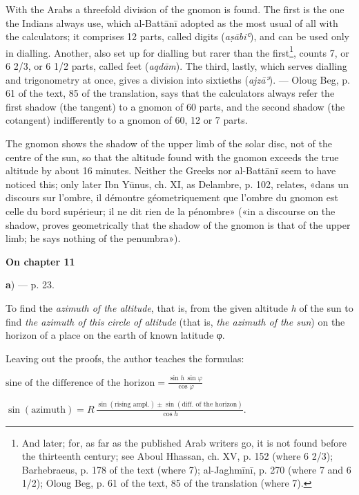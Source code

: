 \documentclass[11pt]{article}
\newcommand{\Pg}[1]{\marginpar{\footnotesize\color{gray}#1}}
\newcommand{\UnitHead}[2]{\par\setcounter{footnoteT}{0}\needspace{8\baselineskip}\bigskip\pdfbookmark[1]{#1}{unit-#2}\hypertarget{EN-#2}{}%
 {\large\bfseries\interlinepenalty=10000 #1\par}\nobreak\medskip}
\begin{document}
\par With the Arabs a threefold division of the gnomon is found. The first is the one the Indians always use, which al-Battānī adopted as the most usual of all with the calculators; it comprises 12 parts, called digits (\emph{aṣābiʿ}), and can be used only in dialling. Another, also set up for dialling but rarer than the first\footnote{And later; for, as far as the published Arab writers go, it is not found before the thirteenth century; see Aboul Hhassan, ch. XV, p. 152 (where 6 2/3); Barhebraeus, p. 178 of the text (where 7); al-Jaghmīnī, p. 270 (where 7 and 6 1/2); Oloug Beg, p. 61 of the text, 85 of the translation (where 7).}, counts 7, or 6 2/3, or 6 1/2 parts, called feet (\emph{aqdām}). The third, lastly, which serves dialling and trigonometry at once, gives a division into sixtieths (\emph{ajzāʾ}). — Oloug Beg, p. 61 of the text, 85 of the translation, says that the calculators always refer the first shadow (the tangent) to a gnomon of 60 parts, and the second shadow (the cotangent) indifferently to a gnomon of 60, 12 or 7 parts.\par
\par The gnomon shows the shadow of the upper limb of the solar disc, not of the centre of the sun, so that the altitude found with the gnomon exceeds the true altitude by about 16 minutes. Neither the Greeks nor al-Battānī seem to have noticed this; only later Ibn Yūnus, ch. XI, as Delambre, p. 102, relates, «dans un discours sur l’ombre, il démontre géometriquement que l’ombre du gnomon est celle du bord supérieur; il ne dit rien de la pénombre» («in a discourse on the shadow, proves geometrically that the shadow of the gnomon is that of the upper limb; he says nothing of the penumbra»).\par
\UnitHead{On chapter 11}{A11}\Pg{I 183}
\par\begin{center}\textbf{a}) — p. 23.\end{center}
\par To find the \emph{azimuth of the altitude}, that is, from the given altitude \emph{h} of the sun to find \emph{the azimuth of this circle of altitude} (that is, \emph{the azimuth of the sun}) on the horizon of a place on the earth of known latitude {\greekfont φ}.\par
\par Leaving out the proofs, the author teaches the formulas: \par\noindent\hspace*{1.5em}$\displaystyle \text{sine of the difference of the horizon} = \frac{\sin h\,\sin\varphi}{\cos\varphi}$\par \par\noindent\hspace*{1.5em}$\displaystyle \sin(\text{azimuth}) = R\,\frac{\sin(\text{rising ampl.}) \pm \sin(\text{diff. of the horizon})}{\cos h}.$\par\par
\end{document}
